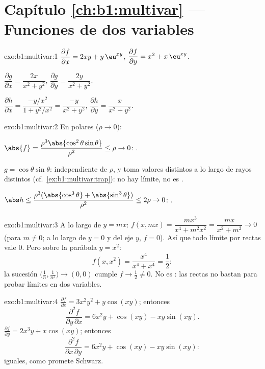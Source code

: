 \section*{Capítulo \ref{ch:b1:multivar} --- Funciones de dos variables}

\begin{solution}{exo:b1:multivar:1}
$\dfrac{\partial f}{\partial x} = 2xy + y\,\eu^{xy}$,
$\dfrac{\partial f}{\partial y} = x^2 + x\,\eu^{xy}$.

$\dfrac{\partial g}{\partial x} = \dfrac{2x}{x^2+y^2}$,
$\dfrac{\partial g}{\partial y} = \dfrac{2y}{x^2+y^2}$.

$\dfrac{\partial h}{\partial x} = \dfrac{-y/x^2}{1 + y^2/x^2} =
\dfrac{-y}{x^2+y^2}$,
$\dfrac{\partial h}{\partial y} = \dfrac{x}{x^2+y^2}$.
\end{solution}

\begin{solution}{exo:b1:multivar:2}
En  polares ($\rho \to 0$):

$\abs{f} = \dfrac{\rho^3\abs{\cos^2\theta\sin\theta}}{\rho^2} \leq
\rho \to 0$: .

$g = \cos\theta\sin\theta$: independiente de $\rho$, y toma valores
distintos a lo largo de rayos distintos (cf.\
\cref{ex:b1:multivar:trap}): no hay límite, no es .

$\abs h \leq \dfrac{\rho^3(\abs{\cos^3\theta} +
\abs{\sin^3\theta})}{\rho^2} \leq 2\rho \to 0$: .
\end{solution}

\begin{solution}{exo:b1:multivar:3}
A lo largo de $y = mx$: $f(x, mx) = \dfrac{m x^3}{x^4 + m^2 x^2} =
\dfrac{mx}{x^2 + m^2} \to 0$ (para $m \neq 0$; a lo largo de $y = 0$ y del
eje $y$, $f = 0$). Así que todo límite por rectas vale $0$. Pero sobre la
parábola $y = x^2$:
\[
f(x, x^2) = \frac{x^4}{x^4 + x^4} = \frac12 :
\]
la sucesión $\bigl(\frac1n, \frac{1}{n^2}\bigr) \to (0,0)$ cumple
$f \to \frac12 \neq 0$. No es : las rectas no bastan para
probar límites en dos variables.
\end{solution}

\begin{solution}{exo:b1:multivar:4}
$\frac{\partial f}{\partial x} = 3x^2y^2 + y\cos(xy)$; entonces
\[
\frac{\partial^2 f}{\partial y\,\partial x}
= 6x^2 y + \cos(xy) - xy\sin(xy) .
\]
$\frac{\partial f}{\partial y} = 2x^3 y + x\cos(xy)$; entonces
\[
\frac{\partial^2 f}{\partial x\,\partial y}
= 6x^2 y + \cos(xy) - xy\sin(xy) :
\]
iguales, como promete Schwarz.
\end{solution}

